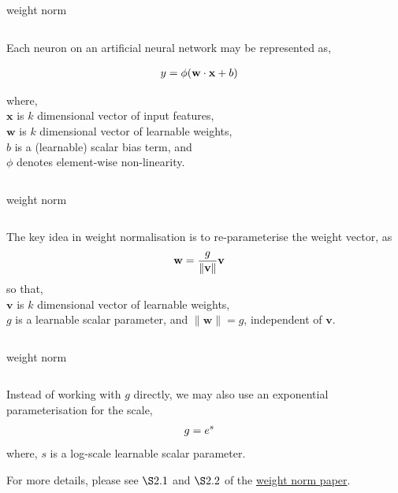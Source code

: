 \documentclass[aspectratio=169,xcolor={dvipsnames,svgnames}]{beamer}
\begin{document}
\begin{frame}[label={sec:weight-norm}]{weight norm}
\begin{columns}
\begin{column}{0.7\columnwidth}
Each neuron on an artificial neural network may be
represented as,

\begin{align}
\notag
y &= \phi(\mathbf{w}\cdot\mathbf{x}+b)
\end{align}

where, \\[0pt]
\(\mathbf{x}\) is \(k\) dimensional vector of input
features, \\[0pt]
\(\mathbf{w}\) is \(k\) dimensional vector of learnable
weights, \\[0pt]
\(b\) is a (learnable) scalar bias term, and \\[0pt]
\(\phi\) denotes element-wise non-linearity.
\end{column}
\end{columns}
\end{frame}

\begin{frame}[label={sec:org30dd335}]{weight norm}
\begin{columns}
\begin{column}{0.45\columnwidth}
The \alert{key idea} in weight normalisation is to
re-parameterise the weight vector, as
\begin{align}
  \notag
  \mathbf{w} &= \frac{g}{\|\mathbf{v}\|} \mathbf{v}
\end{align}
so that, \\[0pt]
\(\mathbf{v}\) is \(k\) dimensional vector of learnable
weights, \\[0pt]
\(g\) is a learnable scalar parameter, and 
\(\|\mathbf{w}\|=g\), independent of \(\mathbf{v}\).
\end{column}
\end{columns}
\end{frame}
\begin{frame}[label={sec:org8c73af7}]{weight norm}
\begin{columns}
\begin{column}{0.45\columnwidth}
Instead of working with \(g\) directly, we may also use
an exponential parameterisation for the scale,
\begin{align}
  \notag
  g &= e^s
\end{align}
where, \(s\) is a log-scale learnable scalar parameter.

For more details, please see \(\S 2.1\) and \(\S 2.2\) of
the \href{http://arxiv.org/abs/1602.07868}{weight norm paper}.
\end{column}
\end{columns}
\end{frame}
\end{document}
